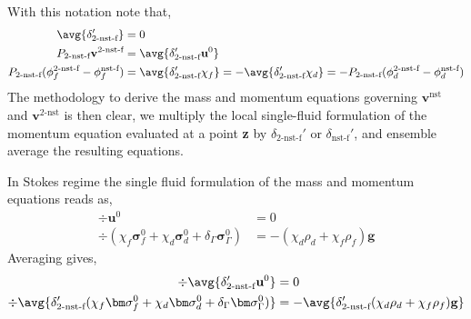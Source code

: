 With this notation note that, 
\begin{align}
    \avg{\delta_\text{2-nst-f}'} &= 0\\
    P_\text{2-nst-f} \textbf{v}^\text{2-nst-f} &= \avg{\delta_\text{2-nst-f}' \textbf{u}^0}\\
    P_\text{2-nst-f} (\phi_f^\text{2-nst-f} -\phi_f^\text{nst-f}) &= \avg{\delta_\text{2-nst-f}' \chi_f}= - \avg{\delta_\text{2-nst-f}' \chi_d}= - P_\text{2-nst-f} (\phi_d^\text{2-nst-f} -\phi_d^\text{nst-f})
\end{align} 
The methodology to derive the mass and momentum equations governing $\textbf{v}^\text{nst}$ and $\textbf{v}^\text{2-nst}$ is then clear, we multiply the local single-fluid formulation of the momentum equation evaluated at a point \textbf{z} by $\delta_\text{2-nst-f}'$ or $\delta_\text{nst-f}'$, and ensemble average the resulting equations. 

In Stokes regime the single fluid formulation of the mass and momentum equations reads as, 
\begin{align}
    \div \textbf{u}^0 & =0 \\
    \div (\chi_f \bm\sigma_f^0 + \chi_d \bm\sigma_d^0 + \delta_\Gamma \bm\sigma_\Gamma^0)
    &=
    - (\chi_d \rho_d + \chi_f \rho_f) \textbf{g}
\end{align}
Averaging gives, 
\begin{align}
    \div \avg{\delta_\text{2-nst-f}' \textbf{u}^0} & =0 \\
    \div \avg{\delta_\text{2-nst-f}' (\chi_f \bm\sigma_f^0 + \chi_d \bm\sigma_d^0 + \delta_\Gamma \bm\sigma_\Gamma^0)}
    &=
    - \avg{\delta_\text{2-nst-f}'(\chi_d \rho_d + \chi_f \rho_f) \textbf{g}}
\end{align}

